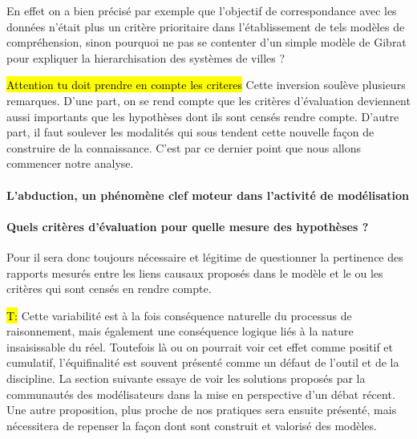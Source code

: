 En effet on a bien précisé par exemple que l'objectif de correspondance avec les données n'était plus un critère prioritaire dans l'établissement de tels modèles de compréhension, sinon pourquoi ne pas se contenter d'un simple modèle de Gibrat pour expliquer la hierarchisation des systèmes de villes ? 

\hl{Attention tu doit prendre en compte les criteres}
Cette inversion soulève plusieurs remarques. D'une part, on se rend compte que les critères d'évaluation deviennent aussi importants que les hypothèses dont ils sont censés rendre compte. D'autre part, il faut soulever les modalités qui sous tendent cette nouvelle façon de construire de la connaissance. C'est par ce dernier point que nous allons commencer notre analyse.

\paragraph{L'abduction, un phénomène clef moteur dans l'activité de modélisation}
\label{p:abduction}



\paragraph{Quels critères d'évaluation pour quelle mesure des hypothèses ?}
\label{p:critere_evaluation}



Pour \textcite{Bulle2005} il sera donc toujours nécessaire et légitime de questionner la pertinence des rapports mesurés entre les liens causaux proposés dans le modèle et le ou les critères qui sont censés en rendre compte.

\hl{T:} 
Cette variabilité est à la fois conséquence naturelle du processus de raisonnement, mais également une conséquence logique liés à la nature insaisissable du réel. Toutefois là ou on pourrait voir cet effet comme positif et cumulatif, l'équifinalité est souvent présenté comme un défaut de l'outil et de la discipline. La section suivante essaye de voir les solutions proposés par la communautés des modélisateurs dans la mise en perspective d'un débat récent. Une autre proposition, plus proche de nos pratiques sera ensuite présenté, mais nécessitera de repenser la façon dont sont construit et valorisé des modèles. %

